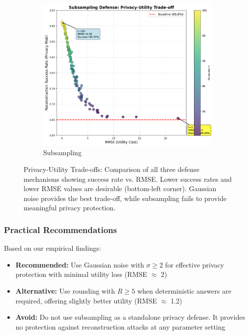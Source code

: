 \documentclass[11pt,letterpaper]{article}
\begin{document}
\begin{figure}[H]
\begin{subfigure}[b]{0.45\textwidth}
        \includegraphics[width=\textwidth]{tradeoff_sample.png}
        \caption{Subsampling}
    \end{subfigure}
    \caption{Privacy-Utility Trade-offs: Comparison of all three defense mechanisms showing success rate vs. RMSE. Lower success rates and lower RMSE values are desirable (bottom-left corner). Gaussian noise provides the best trade-off, while subsampling fails to provide meaningful privacy protection.}
    \label{fig:tradeoff_comparison}
\end{figure}

\subsubsection{Practical Recommendations}

Based on our empirical findings:

\begin{itemize}[leftmargin=*]
    \item \textbf{Recommended:} Use Gaussian noise with $\sigma \geq 2$ for effective privacy protection with minimal utility loss (RMSE $\approx$ 2)
    \item \textbf{Alternative:} Use rounding with $R \geq 5$ when deterministic answers are required, offering slightly better utility (RMSE $\approx$ 1.2)
    \item \textbf{Avoid:} Do not use subsampling as a standalone privacy defense. It provides no protection against reconstruction attacks at any parameter setting
\end{itemize}
\end{document}
